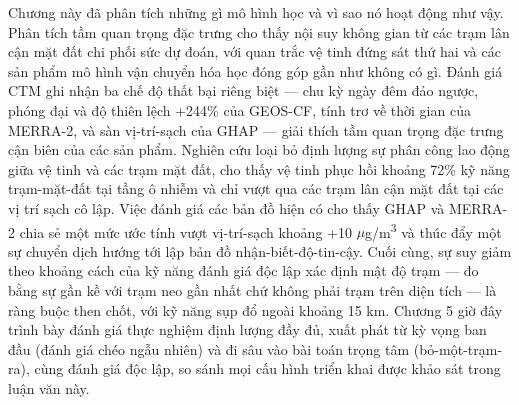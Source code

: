 Chương này đã phân tích những gì mô hình học và vì sao nó hoạt động như vậy. Phân tích tầm quan trọng đặc trưng cho thấy nội suy không gian từ các trạm lân cận mặt đất chi phối sức dự đoán, với quan trắc vệ tinh đứng sát thứ hai và các sản phẩm mô hình vận chuyển hóa học đóng góp gần như không có gì. Đánh giá CTM ghi nhận ba chế độ thất bại riêng biệt --- chu kỳ ngày đêm đảo ngược, phóng đại và độ thiên lệch +244\% của GEOS-CF, tính trơ về thời gian của MERRA-2, và sàn vị-trí-sạch của GHAP --- giải thích tầm quan trọng đặc trưng cận biên của các sản phẩm. Nghiên cứu loại bỏ định lượng sự phân công lao động giữa vệ tinh và các trạm mặt đất, cho thấy vệ tinh phục hồi khoảng 72\% kỹ năng trạm-mặt-đất tại tầng ô nhiễm và chỉ vượt qua các trạm lân cận mặt đất tại các vị trí sạch cô lập. Việc đánh giá các bản đồ hiện có cho thấy GHAP và MERRA-2 chia sẻ một mức ước tính vượt vị-trí-sạch khoảng +10 $\mu$g/m\textsuperscript{3} và thúc đẩy một sự chuyển dịch hướng tới lập bản đồ nhận-biết-độ-tin-cậy. Cuối cùng, sự suy giảm theo khoảng cách của kỹ năng đánh giá độc lập xác định mật độ trạm --- đo bằng sự gần kề với trạm neo gần nhất chứ không phải trạm trên diện tích --- là ràng buộc then chốt, với kỹ năng sụp đổ ngoài khoảng 15 km. Chương 5 giờ đây trình bày đánh giá thực nghiệm định lượng đầy đủ, xuất phát từ kỳ vọng ban đầu (đánh giá chéo ngẫu nhiên) và đi sâu vào bài toán trọng tâm (bỏ-một-trạm-ra), cùng đánh giá độc lập, so sánh mọi cấu hình triển khai được khảo sát trong luận văn này.
